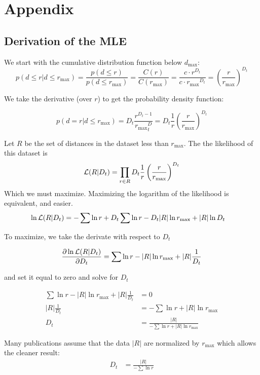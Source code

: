 \documentclass{article}
\begin{document}
\section{Appendix}

\subsection{Derivation of the MLE}

We start with the cumulative distribution function below $d_{\max}$:
\[
p(d \leq r | d \leq r_{\max}) = \frac{p(d \leq r)}{p(d \leq r_{\max})} = \frac{C(r)}{C(r_{\max})} = \frac{c \cdot r^{D_t}}{c \cdot {r_{\max}} ^ {D_t}} = \left ( \frac{r}{r_{\max}} \right )^{D_t}
\]

We take the derivative (over $r$) to get the probability density function:

\[
p(d = r | d \leq r_{\max}) = D_t \frac{r^{D_t-1}}{{r_{\max}}^D_t} = D_t \frac{1}{r} \left (\frac{r}{r_{\max}} \right ) ^ {D_t} 
\]

Let $R$ be the set of distances in the dataset less than $r_{\max}$. The the likelihood of this dataset is
\[
{\cal L}(R|D_t) = \prod_{r \in R} D_t \frac{1}{r} \left (\frac{r}{r_{\max}} \right ) ^ {D_t} 
\] 
Which we must maximize. Maximizing the logarithm of the likelihood is equivalent, and easier.
\begin{align*}
\ln {\cal L}(R|D_t) &= -\sum \ln r + D_t \sum \ln r - D_t |R| \ln r_{\max} + |R| \ln D_t
\end{align*}

To maximize, we take the derivate with respect to $D_t$

\begin{align*}
\frac{\partial \ln{\cal L}(R|D_t)}{\partial D_t} = \sum{\ln r} - |R|\ln r_{\max} + |R|\frac{1}{D_t}
\end{align*}

and set it equal to zero and solve for $D_t$

\begin{align*}
 \sum{\ln r} - |R|\ln r_{\max} + |R|\frac{1}{D_t} &= 0 \\
|R|\frac{1}{D_t} &= - \sum \ln r + |R| \ln r_{\max} \\
D_t &= \frac{|R|}{- \sum \ln r + |R| \ln r_{\max}} 
\end{align*}

Many publications assume that the data $|R|$ are normalized by $r_{\max}$ which allows the cleaner result:
\begin{align*}
D_t &= \frac{|R|}{- \sum \ln r} 
\end{align*}
\end{document}
